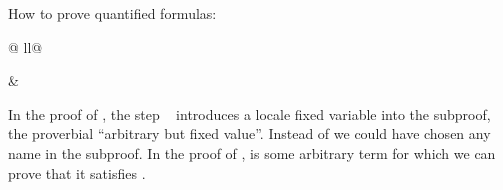 \begin{isabellebody}
\begin{isamarkuptext}
How to prove quantified formulas:
\end{isamarkuptext}%
\begin{tabular}{@ {}ll@ {}}
\begin{minipage}[t]{.4\textwidth}
\end{minipage}
&
\begin{minipage}[t]{.4\textwidth}
\end{minipage}
\end{tabular}
\medskip
\begin{isamarkuptext}%
In the proof of ,
the step ~ introduces a locale fixed variable 
into the subproof, the proverbial ``arbitrary but fixed value''.
Instead of  we could have chosen any name in the subproof.
In the proof of ,
 is some arbitrary
term for which we can prove that it satisfies .


\end{isamarkuptext}
\end{isabellebody}
